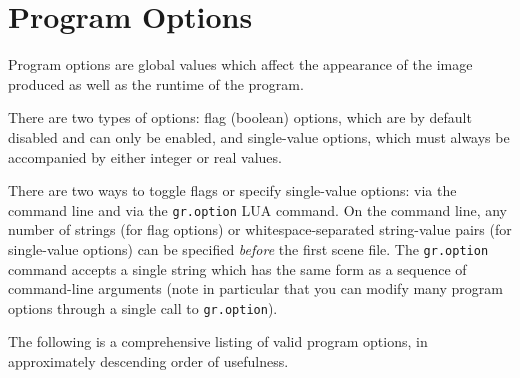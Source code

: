 \documentclass{article}
\begin{document}
\section{Program Options}
\label{program_options}

Program options are global values which affect the appearance of the image
produced as well as the runtime of the program.

There are two types of options: flag (boolean) options, which are by default
disabled and can only be enabled, and single-value options, which must always be
accompanied by either integer or real values.

There are two ways to toggle flags or specify single-value options: via the
command line and via the {\tt gr.option} LUA command. On the command line, any
number of strings (for flag options) or whitespace-separated string-value pairs
(for single-value options) can be specified \emph{before} the first scene file.
The {\tt gr.option} command accepts a single string which has the same form as a
sequence of command-line arguments (note in particular that you can modify many
program options through a single call to {\tt gr.option}).

The following is a comprehensive listing of valid program options, in
approximately descending order of usefulness.
\end{document}
